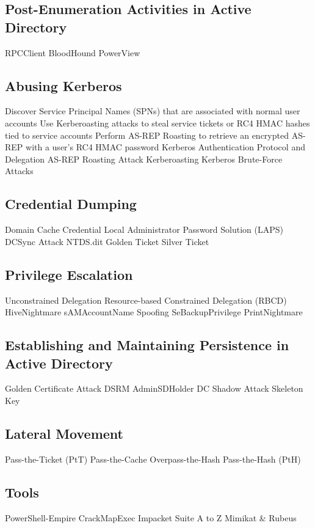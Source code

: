 \documentclass{article}
\begin{document}
\subsection{Post-Enumeration Activities in Active Directory}
RPCClient
BloodHound
PowerView

\subsection{Abusing Kerberos}
Discover Service Principal Names (SPNs) that are associated with normal user accounts
Use Kerberoasting attacks to steal service tickets or RC4 HMAC hashes tied to service accounts
Perform AS-REP Roasting to retrieve an encrypted AS-REP with a user's RC4 HMAC password
Kerberos Authentication Protocol and Delegation
AS-REP Roasting Attack
Kerberoasting
Kerberos Brute-Force Attacks

\subsection{Credential Dumping}
Domain Cache Credential
Local Administrator Password Solution (LAPS)
DCSync Attack
NTDS.dit
Golden Ticket
Silver Ticket

\subsection{Privilege Escalation}
Unconstrained Delegation
Resource-based Constrained Delegation (RBCD)
HiveNightmare
sAMAccountName Spoofing
SeBackupPrivilege
PrintNightmare

\subsection{Establishing and Maintaining Persistence in Active Directory}
Golden Certificate Attack
DSRM
AdminSDHolder
DC Shadow Attack
Skeleton Key

\subsection{Lateral Movement}
Pass-the-Ticket (PtT)
Pass-the-Cache
Overpass-the-Hash
Pass-the-Hash (PtH)

\subsection{Tools}
PowerShell-Empire
CrackMapExec
Impacket Suite
A to Z Mimikat \& Rubeus
\end{document}
